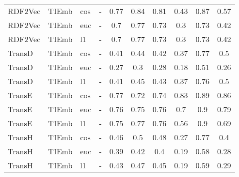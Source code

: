 \begin{longtable}{|llll|ccc|ccc|}
RDF2Vec	&	TIEmb	&	cos	&	-	&	0.77	&	0.84	&	0.81	&	0.43	&	0.87	&	0.57 \\ 
RDF2Vec	&	TIEmb	&	euc	&	-	&	0.7	&	0.77	&	0.73	&	0.3	&	0.73	&	0.42 \\ 
RDF2Vec	&	TIEmb	&	l1	&	-	&	0.7	&	0.77	&	0.73	&	0.3	&	0.73	&	0.42 \\ 
TransD	&	TIEmb	&	cos	&	-	&	0.41	&	0.44	&	0.42	&	0.37	&	0.77	&	0.5 \\ 
TransD	&	TIEmb	&	euc	&	-	&	0.27	&	0.3	&	0.28	&	0.18	&	0.51	&	0.26 \\ 
TransD	&	TIEmb	&	l1	&	-	&	0.41	&	0.45	&	0.43	&	0.37	&	0.76	&	0.5 \\ 
TransE	&	TIEmb	&	cos	&	-	&	0.77	&	0.72	&	0.74	&	0.83	&	0.89	&	0.86 \\ 
TransE	&	TIEmb	&	euc	&	-	&	0.76	&	0.75	&	0.76	&	0.7	&	0.9	&	0.79 \\ 
TransE	&	TIEmb	&	l1	&	-	&	0.75	&	0.77	&	0.76	&	0.56	&	0.9	&	0.69 \\ 
TransH	&	TIEmb	&	cos	&	-	&	0.46	&	0.5	&	0.48	&	0.27	&	0.77	&	0.4 \\ 
TransH	&	TIEmb	&	euc	&	-	&	0.39	&	0.42	&	0.4	&	0.19	&	0.58	&	0.28 \\ 
TransH	&	TIEmb	&	l1	&	-	&	0.43	&	0.47	&	0.45	&	0.19	&	0.59	&	0.29 \\ 
\hline
\end{longtable}
